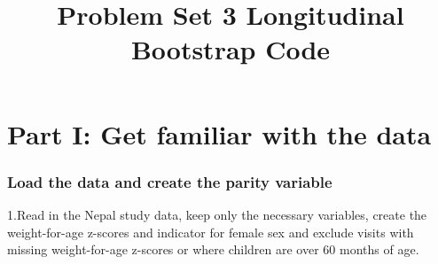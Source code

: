 \documentclass[
]{article}
\title{Problem Set 3 Longitudinal Bootstrap Code}
\author{}
\date{\vspace{-2.5em}}
\newenvironment{Shaded}{\begin{snugshade}}{\end{snugshade}}
\newcommand{\AttributeTok}[1]{\textcolor[rgb]{0.13,0.29,0.53}{#1}}
\newcommand{\ConstantTok}[1]{\textcolor[rgb]{0.56,0.35,0.01}{#1}}
\newcommand{\DecValTok}[1]{\textcolor[rgb]{0.00,0.00,0.81}{#1}}
\newcommand{\FunctionTok}[1]{\textcolor[rgb]{0.13,0.29,0.53}{\textbf{#1}}}
\newcommand{\NormalTok}[1]{#1}
\newcommand{\SpecialCharTok}[1]{\textcolor[rgb]{0.81,0.36,0.00}{\textbf{#1}}}
\begin{document}
\maketitle

\begin{Shaded}
\end{Shaded}

\hypertarget{part-i-get-familiar-with-the-data}{%
\section{Part I: Get familiar with the
data}\label{part-i-get-familiar-with-the-data}}

\hypertarget{load-the-data-and-create-the-parity-variable}{%
\subsubsection{Load the data and create the parity
variable}\label{load-the-data-and-create-the-parity-variable}}

1.Read in the Nepal study data, keep only the necessary variables,
create the weight-for-age z-scores and indicator for female sex and
exclude visits with missing weight-for-age z-scores or where children
are over 60 months of age.
\end{document}
